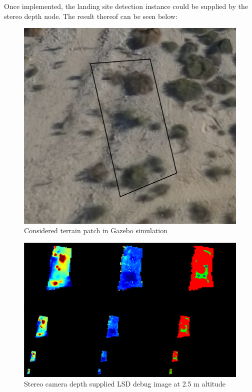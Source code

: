 Once implemented, the landing site detection instance could be supplied by the stereo depth node. The result thereof can be seen below:

\begin{figure}[ht!]
    \centering
    \includegraphics[scale=0.2, angle=-12]{images/stereo_camera_depth/reference_map2.5m_annotated.png}
    \caption{Considered terrain patch in Gazebo simulation}
    \label{stereo_reference}
\end{figure}

\begin{figure}[ht!]
    \centering
    \includegraphics[scale=0.25]{images/stereo_camera_depth/stereo_2.5m.png}
    \caption{Stereo camera depth supplied LSD debug image at 2.5 m altitude}
    \label{qual_stereo_test}
\end{figure}


